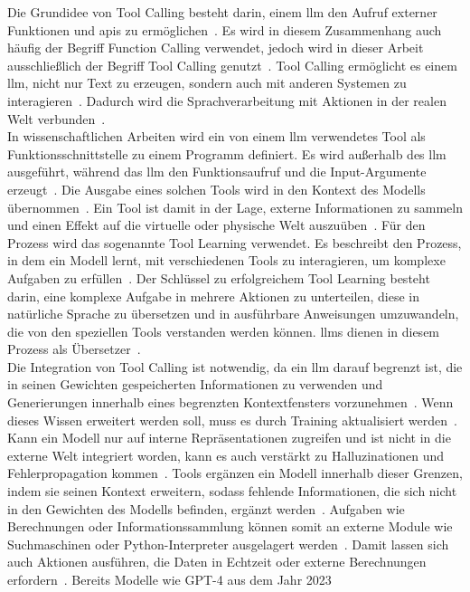 Die Grundidee von Tool Calling besteht darin, einem \ac{llm} den Aufruf externer Funktionen und \acp{api} zu ermöglichen~\cite{tc05}. Es wird in diesem Zusammenhang
auch häufig der Begriff Function Calling verwendet, jedoch wird in dieser Arbeit ausschließlich der Begriff Tool Calling genutzt~\cite{tc04}. Tool Calling 
ermöglicht es einem \ac{llm}, nicht nur Text zu erzeugen, sondern auch mit anderen Systemen zu interagieren~\cite{tc04}. Dadurch wird die Sprachverarbeitung mit 
Aktionen in der realen Welt verbunden~\cite{tc03}\cite{tc05}. \\
In wissenschaftlichen Arbeiten wird ein von einem \ac{llm} verwendetes Tool als Funktionsschnittstelle zu einem Programm definiert. Es wird außerhalb des \ac{llm}
ausgeführt, während das \ac{llm} den Funktionsaufruf und die Input-Argumente erzeugt~\cite[5]{tc10}. Die Ausgabe eines solchen Tools
wird in den Kontext des Modells übernommen~\cite[3]{tc09}. Ein Tool ist damit in der Lage, externe Informationen zu sammeln und einen Effekt auf die virtuelle oder 
physische 
Welt auszuüben~\cite[3]{tc09}. Für den Prozess wird das sogenannte Tool Learning verwendet. Es beschreibt den Prozess, in dem ein Modell lernt, mit verschiedenen 
Tools zu interagieren, um komplexe Aufgaben zu erfüllen~\cite[5]{tc10}. Der Schlüssel zu erfolgreichem Tool Learning besteht darin, eine komplexe Aufgabe in mehrere
Aktionen zu unterteilen, diese in natürliche Sprache zu übersetzen und in ausführbare Anweisungen umzuwandeln, die von den speziellen Tools verstanden werden können. 
\acp{llm} dienen in diesem Prozess als Übersetzer~\cite[9]{tc11}. \\
Die Integration von Tool Calling ist notwendig, da ein \ac{llm} darauf begrenzt ist, die in seinen Gewichten gespeicherten Informationen zu 
verwenden und Generierungen innerhalb eines begrenzten Kontextfensters vorzunehmen~\cite[1]{tc16}. Wenn dieses Wissen erweitert werden soll, muss es durch Training
aktualisiert werden~\cite[1]{tc16}. Kann ein Modell nur auf interne Repräsentationen zugreifen und ist nicht in die externe Welt integriert worden, kann es auch 
verstärkt 
zu Halluzinationen und Fehlerpropagation kommen~\cite[2]{tc15}. Tools ergänzen ein Modell innerhalb dieser Grenzen, indem sie seinen Kontext erweitern, sodass fehlende
Informationen, die sich nicht in den Gewichten des Modells befinden, ergänzt werden~\cite[3]{tc09}.
Aufgaben wie Berechnungen oder Informationssammlung können somit an externe Module wie Suchmaschinen oder Python-Interpreter ausgelagert werden~\cite[9]{tc09}.
Damit lassen sich auch Aktionen ausführen, die Daten in Echtzeit oder externe Berechnungen erfordern~\cite[2]{tc14}. Bereits Modelle wie GPT-4 aus dem Jahr 2023~\cite[10]{llm09} 
